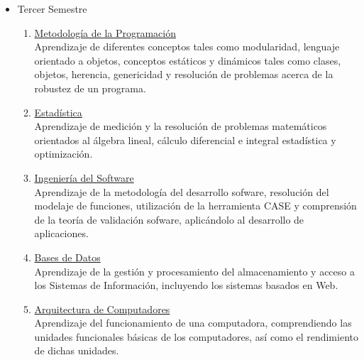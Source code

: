 \begin{itemize}
\item Tercer Semestre
\begin{enumerate}
\item \underline{Metodología de la Programación}\\Aprendizaje de diferentes conceptos tales como modularidad, lenguaje orientado a objetos, conceptos estáticos y dinámicos tales como clases, objetos, herencia, genericidad y resolución de problemas acerca de la robustez de un programa. 
\item \underline{Estadística}\\Aprendizaje de  medición y  la resolución de problemas matemáticos orientados al álgebra lineal, cálculo diferencial e integral estadística y optimización.
\item \underline{Ingeniería del Software}\\Aprendizaje de la metodología del desarrollo sofware, resolución del modelaje de funciones, utilización de la herramienta CASE y comprensión de la teoría de validación sofware, aplicándolo al desarrollo de aplicaciones. 
\item \underline{Bases de Datos}\\Aprendizaje de la gestión  y procesamiento del almacenamiento y acceso a los Sistemas de Información, incluyendo los sistemas basados en Web. 
\item \underline{Arquitectura de Computadores}\\Aprendizaje del funcionamiento de una computadora, comprendiendo las unidades funcionales básicas de los computadores, así como el rendimiento de dichas unidades. 
\end{enumerate}
\end{itemize}
